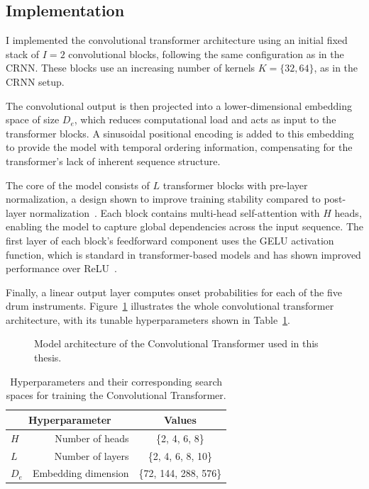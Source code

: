 \subsection{Implementation}

I implemented the convolutional transformer architecture using an initial fixed stack of $I = 2$ convolutional blocks, following the same configuration as in the \gls{CRNN}. These blocks use an increasing number of kernels $K = \{32, 64\}$, as in the \gls{CRNN} setup. 

The convolutional output is then projected into a lower-dimensional embedding space of size $D_e$, which reduces computational load and acts as input to the transformer blocks. A sinusoidal positional encoding is added to this embedding to provide the model with temporal ordering information, compensating for the transformer's lack of inherent sequence structure. 

The core of the model consists of $L$ transformer blocks with pre-layer normalization, a design shown to improve training stability compared to post-layer normalization~\cite{pmlr-v119-xiong20b}. Each block contains multi-head self-attention with $H$ heads, enabling the model to capture global dependencies across the input sequence. The first layer of each block's feedforward component uses the \gls{GELU} activation function, which is standard in transformer-based models and has shown improved performance over \gls{ReLU}~\cite{devlin-etal-2019-bert, hendrycks2023gaussianerrorlinearunits}. 

Finally, a linear output layer computes onset probabilities for each of the five drum instruments. Figure~\ref{CTFigure} illustrates the whole convolutional transformer architecture, with its tunable hyperparameters shown in Table~\ref{CTHyperparams}.

\begin{figure}[H]
    \centering
    
    \caption{Model architecture of the Convolutional Transformer used in this thesis.}
    \label{CTFigure}
\end{figure}

\begin{table}[H]
    \centering
    \begin{tabular}{lr|c}
        \multicolumn{2}{c|}{Hyperparameter} & Values       \\
        \hline
        $H$ & Number of heads     & \{2, 4, 6, 8\} \\
        $L$ & Number of layers      & \{2, 4, 6, 8, 10\} \\
        $D_e$ & Embedding dimension      & \{72, 144, 288, 576\} \\
    \end{tabular}
    \caption{Hyperparameters and their corresponding search spaces for training the Convolutional Transformer.}
    \label{CTHyperparams}
\end{table}

